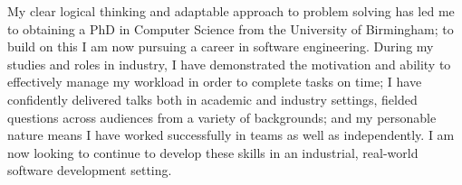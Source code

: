 
\vspace*{\fill}
\hspace{-2.5em}
\begin{minipage}{\sidewidth+0.5\margin}
  \begin{center}

    \vspace{1.5em}


    \vspace{1em}

    My clear logical thinking and adaptable approach to problem solving has
    led me to obtaining a PhD in Computer Science from the University of
    Birmingham; to build on this I am now pursuing a career in software
    engineering.
    During my studies and roles in industry, I have demonstrated the
    motivation and ability to effectively manage my workload in order
    to complete tasks on time; I have confidently delivered talks both in
    academic and industry settings, fielded questions across audiences from
    a variety of backgrounds; and my personable nature means I have worked
successfully in teams as well as independently.
    I am now looking to continue to develop these skills in an industrial,
    real-world software development setting.

    \vspace{1.5em}


    \vspace{1em}



\end{center}
\end{minipage}
